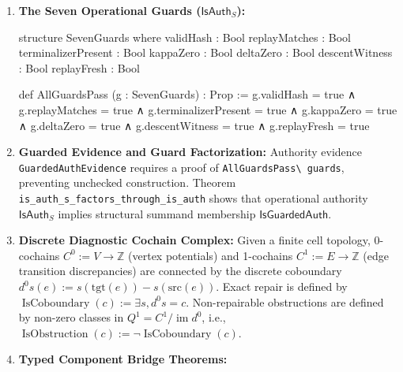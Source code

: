 \documentclass[
  10pt,
]{article}
\newenvironment{Shaded}{}{}
\newcommand{\NormalTok}[1]{#1}
\DeclareRobustCommand{\texttt}[1]{{\paperSymbolFont\nolinkurl{#1}}}
\begin{document}
\begin{enumerate}
\def\labelenumi{\arabic{enumi}.}
\item
  \textbf{The Seven Operational Guards (\protect\hypertarget{math-E0033-0091}{}{\(\mathsf{IsAuth}_S\)}):}

\begin{Shaded}
\begin{Highlighting}[]
\NormalTok{structure SevenGuards where}
\NormalTok{  validHash : Bool}
\NormalTok{  replayMatches : Bool}
\NormalTok{  terminalizerPresent : Bool}
\NormalTok{  kappaZero : Bool}
\NormalTok{  deltaZero : Bool}
\NormalTok{  descentWitness : Bool}
\NormalTok{  replayFresh : Bool}

\NormalTok{def AllGuardsPass (g : SevenGuards) : Prop :=}
\NormalTok{  g.validHash = true ∧ g.replayMatches = true ∧ g.terminalizerPresent = true ∧}
\NormalTok{  g.kappaZero = true ∧ g.deltaZero = true ∧ g.descentWitness = true ∧ g.replayFresh = true}
\end{Highlighting}
\end{Shaded}
\item
  \textbf{Guarded Evidence and Guard Factorization:} Authority evidence \texttt{GuardedAuthEvidence} requires a proof of \texttt{AllGuardsPass\ guards}, preventing unchecked construction. Theorem \texttt{is\_auth\_s\_factors\_through\_is\_auth} shows that operational authority \protect\hypertarget{math-E0033-0092}{}{\(\mathsf{IsAuth}_S\)} implies structural summand membership \protect\hypertarget{math-E0065-0093}{}{\(\mathsf{IsGuardedAuth}\)}.
\item
  \textbf{Discrete Diagnostic Cochain Complex:} Given a finite cell topology, 0-cochains \protect\hypertarget{math-E0066-0094}{}{\(C^0 := V \to \mathbb{Z}\)} (vertex potentials) and 1-cochains \protect\hypertarget{math-E0067-0095}{}{\(C^1 := E \to \mathbb{Z}\)} (edge transition discrepancies) are connected by the discrete coboundary \protect\hypertarget{math-E0068-0096}{}{\(d^0 s(e) := s(\mathrm{tgt}(e)) - s(\mathrm{src}(e))\)}. Exact repair is defined by \protect\hypertarget{math-E0069-0097}{}{\(\operatorname{IsCoboundary}(c) := \exists s, d^0 s = c\)}. Non-repairable obstructions are defined by non-zero classes in \protect\hypertarget{math-E0038-0098}{}{\(Q^1 = C^1 / \operatorname{im} d^0\)}, i.e., \protect\hypertarget{math-E0070-0099}{}{\(\operatorname{IsObstruction}(c) := \neg \operatorname{IsCoboundary}(c)\)}.
\item
  \textbf{Typed Component Bridge Theorems:}


\end{enumerate}
\end{document}
